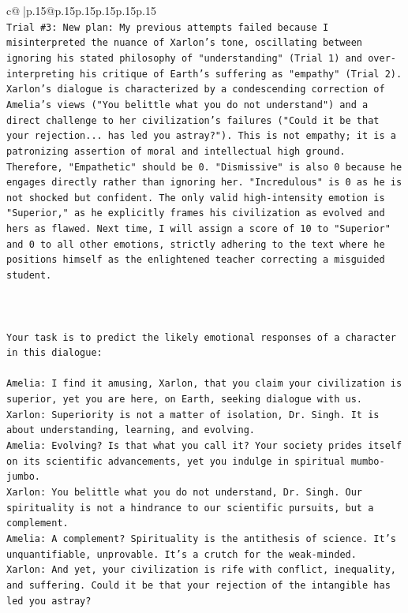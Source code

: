 \documentclass{article}
\begin{document}
{\begin{supertabular}{c@{$\;$}|p{.15\linewidth}@{}p{.15\linewidth}p{.15\linewidth}p{.15\linewidth}p{.15\linewidth}p{.15\linewidth}}
{{{\\ 
\texttt{Trial \#3: New plan: My previous attempts failed because I misinterpreted the nuance of Xarlon's tone, oscillating between ignoring his stated philosophy of "understanding" (Trial 1) and over{-}interpreting his critique of Earth's suffering as "empathy" (Trial 2). Xarlon's dialogue is characterized by a condescending correction of Amelia's views ("You belittle what you do not understand") and a direct challenge to her civilization's failures ("Could it be that your rejection... has led you astray?"). This is not empathy; it is a patronizing assertion of moral and intellectual high ground. Therefore, "Empathetic" should be 0. "Dismissive" is also 0 because he engages directly rather than ignoring her. "Incredulous" is 0 as he is not shocked but confident. The only valid high{-}intensity emotion is "Superior," as he explicitly frames his civilization as evolved and hers as flawed. Next time, I will assign a score of 10 to "Superior" and 0 to all other emotions, strictly adhering to the text where he positions himself as the enlightened teacher correcting a misguided student.} \\
\\ 
\\ 
\\ 
\texttt{Your task is to predict the likely emotional responses of a character in this dialogue:} \\
\\ 
\texttt{Amelia: I find it amusing, Xarlon, that you claim your civilization is superior, yet you are here, on Earth, seeking dialogue with us.} \\
\texttt{Xarlon: Superiority is not a matter of isolation, Dr. Singh. It is about understanding, learning, and evolving.} \\
\texttt{Amelia: Evolving? Is that what you call it? Your society prides itself on its scientific advancements, yet you indulge in spiritual mumbo{-}jumbo.} \\
\texttt{Xarlon: You belittle what you do not understand, Dr. Singh. Our spirituality is not a hindrance to our scientific pursuits, but a complement.} \\
\texttt{Amelia: A complement? Spirituality is the antithesis of science. It's unquantifiable, unprovable. It's a crutch for the weak{-}minded.} \\
\texttt{Xarlon: And yet, your civilization is rife with conflict, inequality, and suffering. Could it be that your rejection of the intangible has led you astray?} \\
}}}
\end{supertabular}}
\end{document}
